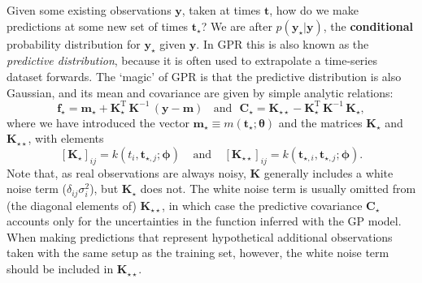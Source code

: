 \documentclass[letterpaper]{ar-1col}
\newcommand{\hyperparams}{\ensuremath{\boldsymbol{\phi}}}
\newcommand{\meanparams}{\ensuremath{\boldsymbol{\theta}}}
\begin{document}
Given some existing observations $\mathbf{y}$, taken at times $\mathbf{t}$, how do we make predictions at some new set of times $\mathbf{t}_\star$? We are after $p(\mathbf{y}_\star|\mathbf{y})$, the \textbf{conditional} probability distribution for $\mathbf{y}_\star$ given $\mathbf{y}$. In GPR this is also known as the \emph{predictive distribution}, because it is often used to extrapolate a time-series dataset forwards. The `magic' of GPR is that the predictive distribution is also Gaussian, and its mean and covariance are given by simple analytic relations:
\begin{equation}
  \label{eq:pred}
  \mathbf{f}_\star = \mathbf{m}_\star + \mathbf{K}_\star^{\mathrm{T}} \, \mathbf{K}^{-1} \, (\mathbf{y} - \mathbf{m}) ~\mathrm{~~~and~~~}
  \mathbf{C}_\star =   \mathbf{K}_{\star\star} - \mathbf{K}_\star^{\mathrm{T}} \, \mathbf{K}^{-1} \, \mathbf{K}_\star,
\end{equation}
where we have introduced the vector $\mathbf{m}_\star \equiv m(\mathbf{t}_\star;\meanparams)$ and the matrices $\mathbf{K}_\star$ and $\mathbf{K}_{\star\star}$, with elements
\begin{equation}
  \label{eq:Kstar}
    [\mathbf{K}_\star]_{ij} = k(t_i,\mathbf{t}_{\star,j}; \hyperparams) ~~~~~ \text{and} ~~~~~
    [\mathbf{K}_{\star\star}]_{ij} = k(\mathbf{t}_{\star,i},\mathbf{t}_{\star,j};\hyperparams).
\end{equation}
Note that, as real observations are always noisy, $\mathbf{K}$ generally includes a white noise term ($\delta_{ij} \sigma^2_i$), but $\mathbf{K}_\star$ does not. The white noise term is usually omitted from (the diagonal elements of) $\mathbf{K}_{\star\star}$, in which case the predictive covariance $\mathbf{C}_\star$ accounts only for the uncertainties in the function inferred with the GP model. When making predictions that represent hypothetical additional observations taken with the same setup as the training set, however, the white noise term should be included in $\mathbf{K}_{\star\star}$. %
\end{document}
